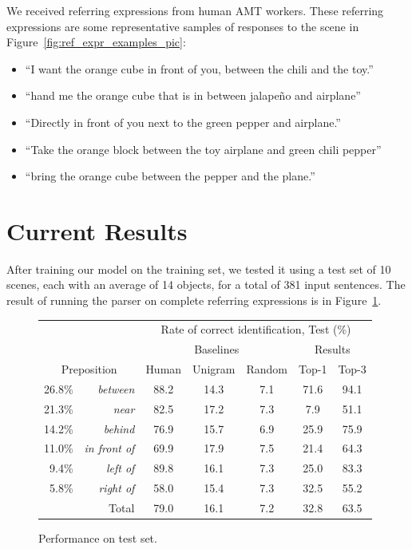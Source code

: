 \documentclass[letterpaper,10pt]{article}
\begin{document}
We received referring expressions from human AMT workers. These referring expressions are some representative samples of responses to the scene in Figure~\ref{fig:ref_expr_examples_pic}:

\begin{itemize}[topsep=0pt,itemsep=-1ex,partopsep=1ex,parsep=1ex]
	\item ``I want the orange cube in front of you, between the chili and the toy.''
	\item ``hand me the orange cube that is in between jalape\~{n}o and airplane''
	\item ``Directly in front of you next to the green pepper and airplane.''
	\item ``Take the orange block between the toy airplane and green chili pepper''
	\item ``bring the orange cube between the pepper and the plane.''
\end{itemize}

\section{Current Results}

After training our model on the training set, we tested it using a test set of 10 scenes, each with an average of 14 objects, for a total of 381 input sentences. The result of running the parser on complete referring expressions is in Figure~\ref{fig:results}.

\begin{figure}[H]
  \centering
  \begin{tabular}{| r r | c | c | c || c c |} \hline
     & & \multicolumn{5}{c|}{Rate of correct identification, Test (\%)} \\
     & & \multicolumn{3}{c||}{Baselines} & \multicolumn{2}{c|}{Results} \\
     \multicolumn{2}{|c|}{Preposition}
			                      &   Human & Unigram & Random &  Top-1 & Top-3 \\\hline
26.8\% & \textit{between}       & 88.2  & 14.3  & 7.1   & 71.6  & 94.1 \\
21.3\% & \textit{near}          & 82.5  & 17.2  & 7.3   & 7.9   & 51.1 \\
14.2\% & \textit{behind}        & 76.9  & 15.7  & 6.9   & 25.9  & 75.9 \\
11.0\% & \textit{in front of}   & 69.9  & 17.9  & 7.5   & 21.4  & 64.3 \\
9.4\% & \textit{left of}        & 89.8  & 16.1  & 7.3   & 25.0  & 83.3 \\
5.8\% & \textit{right of}       & 58.0  & 15.4  & 7.3   & 32.5  & 55.2 \\\hline\hline
    \multicolumn{2}{|r|}{Total} & 79.0  & 16.1  & 7.2   & 32.8  & 63.5 \\\hline
  \end{tabular}
  \caption{Performance on test set.}
  \label{fig:results}
\end{figure}
\end{document}
